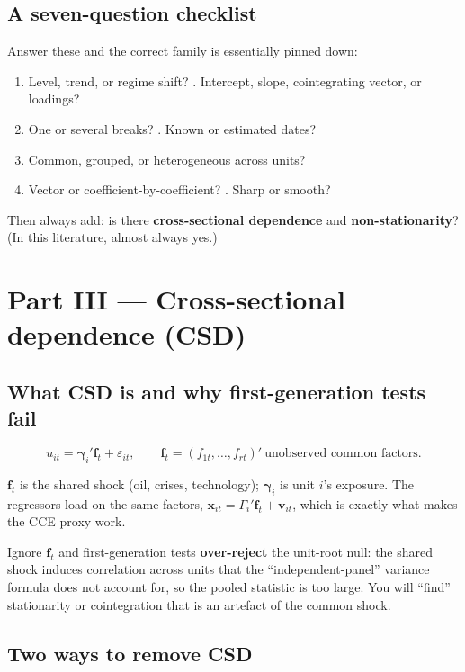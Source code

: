 \documentclass[11pt,a4paper]{article}
\newcommand{\hlt}[2]{\textcolor{#1}{\textbf{#2}}}
\newcommand{\bgamma}{\boldsymbol{\gamma}}
\newcommand{\bx}{\mathbf{x}}
\newcommand{\bff}{\mathbf{f}}
\theoremstyle{definition}
\begin{document}
\subsection{A seven-question checklist}
Answer these and the correct family is essentially pinned down:
\begin{enumerate}[leftmargin=1.5em,itemsep=0pt]
 \item Level, trend, or regime shift? . Intercept, slope, cointegrating vector, or loadings?
 \item One or several breaks? . Known or estimated dates?
 \item Common, grouped, or heterogeneous across units?
 \item Vector or coefficient-by-coefficient? . Sharp or smooth?
\end{enumerate}
Then always add: is there \hlt{ccyan}{cross-sectional dependence} and \hlt{cred}{non-stationarity}?
(In this literature, almost always yes.)

\section{Part III --- Cross-sectional dependence (CSD)}

\subsection{What CSD is and why first-generation tests fail}
\begin{eqbox}
\[
u_{it}=\bgamma_i'\bff_t+\varepsilon_{it},\qquad
\bff_t=(f_{1t},\dots,f_{rt})'\ \text{unobserved common factors.}
\]
\end{eqbox}
$\bff_t$ is the shared shock (oil, crises, technology); $\bgamma_i$ is unit $i$'s exposure. The
regressors load on the same factors, $\bx_{it}=\Gamma_i'\bff_t+\mathbf v_{it}$, which is exactly what
makes the CCE proxy work.
\begin{warnbox}
Ignore $\bff_t$ and first-generation tests \textbf{over-reject} the unit-root null: the shared shock
induces correlation across units that the ``independent-panel'' variance formula does not account
for, so the pooled statistic is too large. You will ``find'' stationarity or cointegration that is an
artefact of the common shock.
\end{warnbox}

\subsection{Two ways to remove CSD}
\end{document}
